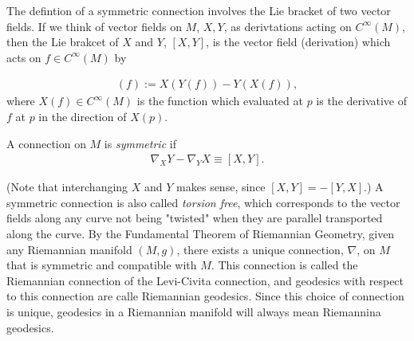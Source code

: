 The defintion of a symmetric connection involves the Lie bracket of two vector fields. If we think of vector fields on $M$, $X, Y$, as derivtations acting on $C^\infty (M)$, then the Lie brakcet of $X$ and $Y$, $[X , Y]$, is the vector field (derivation) which acts on $f \in C^\infty (M)$ by

\begin{align*}
[X , Y] (f) := X(Y(f)) - Y(X(f)),
\end{align*}
where $X(f) \in C^\infty (M)$ is the function which evaluated at $p$ is the derivative of $f$ at $p$ in the direction of $X(p)$. 

\begin{definition}
A connection on $M$ is \textit{symmetric} if 
\begin{align*}
\nabla_X Y - \nabla_Y X \equiv [X, Y].
\end{align*}
\end{definition}

(Note that interchanging $X$ and $Y$ makes sense, since $[X, Y] = - [Y, X]$.) A symmetric connection is also called \textit{torsion free}, which corresponds to the vector fields along any curve not being "twisted" when they are parallel transported along the curve. By the Fundamental Theorem of Riemannian Geometry, given any Riemannian manifold $(M,g)$, there exists a unique connection, $\nabla$, on $M$ that is symmetric and compatible with $M$. This connection is called the Riemannian connection of the Levi-Civita connection, and geodesics with respect to this connection are calle Riemannian geodesics. Since this choice of connection is unique, geodesics in a Riemannian manifold will always mean Riemannina geodesics.   







\newpage
\thispagestyle{empty}
\cleartooddpage

